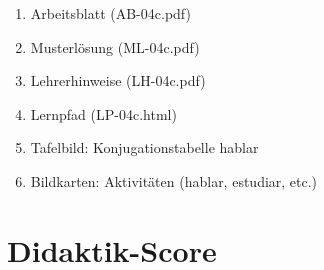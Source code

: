 \documentclass[11pt,a4paper]{article}
\begin{document}
\begin{enumerate}
    \item Arbeitsblatt (AB-04c.pdf)
    \item Musterlösung (ML-04c.pdf)
    \item Lehrerhinweise (LH-04c.pdf)
    \item Lernpfad (LP-04c.html)
    \item Tafelbild: Konjugationstabelle hablar
    \item Bildkarten: Aktivitäten (hablar, estudiar, etc.)
\end{enumerate}

\newpage
\section{Didaktik-Score}
\end{document}

